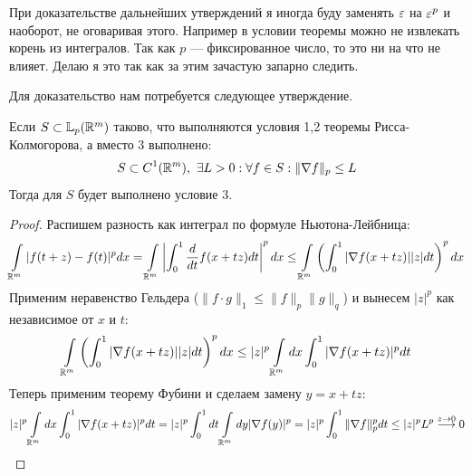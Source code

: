 \begin{remark}
	При доказательстве дальнейших утверждений я иногда буду заменять $\varepsilon$ на $\varepsilon^p$ и наоборот, не оговаривая этого. Например в условии теоремы можно не извлекать корень из интегралов. Так как $p$ --- фиксированное число, то это ни на что не влияет. Делаю я это так как за этим зачастую запарно следить.
\end{remark}
Для доказательство нам потребуется следующее утверждение.
\begin{claim}
	Если $S \subset \mathbb{L}_p(\mathbb{R}^m)$ таково, что выполняются условия 1,2 теоремы Рисса-Колмогорова, а вместо 3 выполнено:
	$$
	S \subset C^{1}(\mathbb{R}^m), \ \exists L > 0: \forall f \in S :  \|\nabla f \|_p \leq L
	$$
	Тогда для $S$ будет выполнено условие 3.
\end{claim}
\begin{proof}
	Распишем разность как интеграл по формуле Ньютона-Лейбница:
	$$
	\int\limits_{\mathbb{R}^m}|f(t + z) - f(t)|^pdx = \int\limits_{\mathbb{R}^m}\left|\int_{0}^1\frac{d}{dt} f(x + tz)dt \right|^pdx \leq \int\limits_{\mathbb{R}^m} \left(\int_{0}^1 |\nabla f(x + tz)||z|dt\right)^pdx
	$$
	Применим неравенство Гельдера ($\|f \cdot g\|_1 \leq \|f\|_p \|g\|_q$) и вынесем $|z|^p$ как независимое от $x$ и $t$:
	$$
	\int\limits_{\mathbb{R}^m} \left(\int_{0}^1 |\nabla f(x + tz)||z|dt\right)^pdx \leq  |z|^p\int\limits_{\mathbb{R}^m}dx \int_0^1|\nabla f(x+tz)|^pdt
	$$
	Теперь применим теорему Фубини и сделаем замену $y = x + tz$:
	$$
	|z|^p\int\limits_{\mathbb{R}^m}dx \int_0^1|\nabla f(x+tz)|^pdt  =  |z|^p \int_{0}^1dt \int\limits_{\mathbb{R}^m}dy |\nabla f(y)|^p = |z|^p\int_{0}^1 \|\nabla f\|_p^p dt  \leq |z|^pL^p \stackrel{z \rightarrow 0}{\longrightarrow} 0 
	$$
\end{proof}
